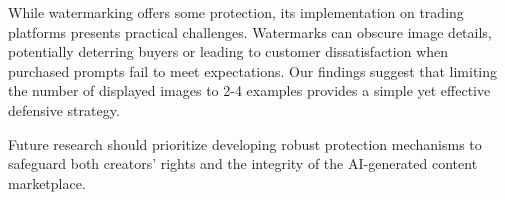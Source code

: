 While watermarking offers some protection, its implementation on trading platforms presents practical challenges. Watermarks can obscure image details, potentially deterring buyers or leading to customer dissatisfaction when purchased prompts fail to meet expectations. Our findings suggest that limiting the number of displayed images to 2-4 examples provides a simple yet effective defensive strategy.

Future research should prioritize developing robust protection mechanisms to safeguard both creators' rights and the integrity of the AI-generated content marketplace.